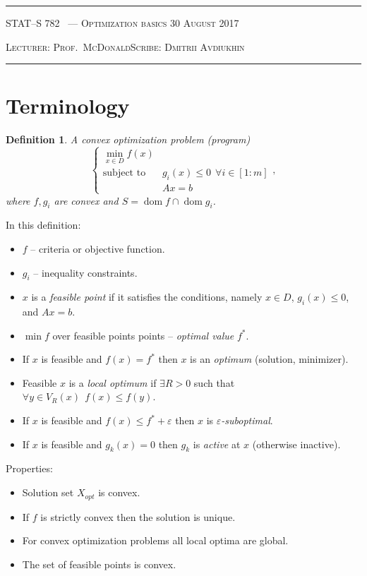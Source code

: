 \documentclass[10pt]{article}
\newcounter{lecnum}
\newtheorem{definition}[def]{Definition}
\DeclareMathOperator*{\dom}{dom}
\newcommand{\minl}{\min\limits}
\newcommand{\lecturer}{Prof.\ McDonald}
\newcommand{\scribe}{Dmitrii Avdiukhin}
\newcommand{\chtitle}{Optimization basics}
\newcommand{\lecdate}{30 August 2017}
\begin{document}
\rule{6.5in}{1pt}

\textsc{STAT--S 782
        \hfill \thelecnum\ --- \chtitle
        \hfill \lecdate}

\textsc{Lecturer: \lecturer \hfill Scribe: \scribe}
\rule{6.5in}{1pt}



\section{Terminology}
\label{sec:terminology}

\begin{definition}
  A convex optimization problem (program)
  \[\left\{
    \begin{array}{ll}
    \minl_{x \in D} f(x) & \\
    \text{subject to} & g_i(x) \leq 0\ \ \forall i \in [1:m] \\
                    & A x = b 
    \end{array}
    \right.,
  \]
  where $f, g_i$ are convex and $S = \dom f \cap \dom g_i$.
\end{definition}
In this definition:
\begin{itemize}
  \item $f$ -- criteria or objective function.
  \item $g_i$ -- inequality constraints.
  \item $x$ is a \emph{feasible point} if it satisfies the conditions,
    namely $x \in D$, $g_i(x) \leq 0$, and $A x = b$.
  \item $\min f$ over feasible points points -- \emph{optimal value} $f^*$.
  \item If $x$ is feasible and $f(x) = f^*$ then $x$ is an \emph{optimum} (solution, minimizer).
  \item Feasible $x$ is a \emph{local optimum} if $\exists R > 0$ such that $\forall y \in V_R(x)\ \ f(x) \leq f(y)$.
  \item If $x$ is feasible and $f(x) \leq f^* + \varepsilon$ then $x$ is \emph{$\varepsilon$-suboptimal}.
  \item If $x$ is feasible and $g_k(x) = 0$ then $g_k$ is \emph{active} at $x$ (otherwise inactive).
\end{itemize}
Properties:
\begin{itemize}
  \item Solution set $X_{opt}$ is convex.
  \item If $f$ is strictly convex then the solution is unique.
  \item For convex optimization problems all local optima are global.
  \item The set of feasible points is convex.
\end{itemize}
\end{document}
